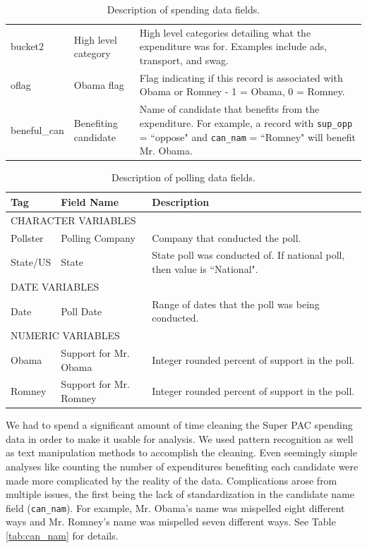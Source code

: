 \documentclass[11pt]{article}\usepackage{graphicx, color}
\begin{document}
\begin{table}[h!]
\begin{tabular}[\textwidth]{l l p{}}
bucket2 & High level category & High level categories detailing what the expenditure was for. Examples include ads, transport, and swag.\\
oflag & Obama flag & Flag indicating if this record is associated with Obama or Romney - 1 = Obama, 0 = Romney.\\
beneful\_can & Benefiting candidate & Name of candidate that benefits from the expenditure. For example, a record with \texttt{sup\_opp} = ``oppose" and \texttt{can\_nam} = ``Romney" will benefit Mr. Obama.\\
\end{tabular}
\caption{Description of spending data fields.}
\label{tab:spendData}
\end{table}

\begin{table}[h!]
\begin{tabular}{l p{} p{}}
Tag & Field Name & Description\\
\hline
\hline
\multicolumn{3}{l}{\MakeTextUppercase{Character Variables}}\\
\hline
Pollster & Polling Company & Company that conducted the poll. \\
State/US & State & State poll was conducted of. If national poll, then value is ``National".\\
\hline
\multicolumn{3}{l}{\MakeTextUppercase{Date Variables}}\\
\hline
Date & Poll Date & Range of dates that the poll was being conducted.\\
\hline
\multicolumn{3}{l}{\MakeTextUppercase{Numeric Variables}}\\
\hline
Obama & Support for Mr. Obama & Integer rounded percent of support in the poll. \\
Romney & Support for Mr. Romney & Integer rounded percent of support in the poll.
\end{tabular}
\caption{Description of polling data fields.}
\label{tab:pollData}
\end{table}

We had to spend a significant amount of time cleaning the Super PAC spending data in order to make it usable for analysis. We used pattern recognition as well as text manipulation methods to accomplish the cleaning. Even seemingly simple analyses like counting the number of expenditures benefiting each candidate were made more complicated by the reality of the data. Complications arose from multiple issues, the first being the lack of standardization in the candidate name field (\texttt{can\_nam}). For example, Mr. Obama's name was mispelled eight different ways and Mr. Romney's name was mispelled seven different ways. See Table \ref{tab:can_nam} for details. 
\end{document}
